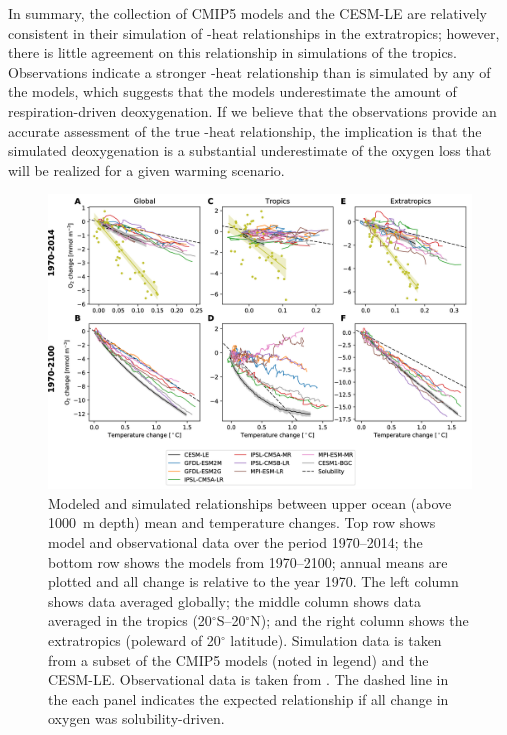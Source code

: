 \documentclass{report_chapter}
\begin{document}
In summary, the collection of CMIP5 models and the CESM-LE are relatively consistent in their simulation of \OO{}-heat relationships in the extratropics; however, there is little agreement on this relationship in simulations of the tropics.
Observations indicate a stronger \OO{}-heat relationship than is simulated by any of the models, which suggests that the models underestimate the amount of respiration-driven deoxygenation.
If we believe that the observations provide an accurate assessment of the true \OO{}-heat relationship, the implication is that the simulated deoxygenation is a substantial underestimate of the oxygen loss that will be realized for a given warming scenario.

\begin{figure}[tbp]
\centering
\includegraphics[width=1.1\textwidth]{o2change-temp-phase-diag.png}
\caption{Modeled and simulated relationships between upper ocean (above 1000~m depth) mean \OO{} and temperature changes.
Top row shows model and observational data over the period 1970--2014; the bottom row shows the models from 1970--2100; annual means are plotted and all change is relative to the year 1970.
The left column shows data averaged globally; the middle column shows data averaged in the tropics (20$^\circ$S--20$^\circ$N); and the right column shows  the extratropics (poleward of 20$^\circ$ latitude).
Simulation data is taken from a subset of the CMIP5 models (noted in legend) and the CESM-LE.
Observational data is taken from \citet{Ito-Minobe-etal-2017}.
The dashed line in the each panel indicates the expected relationship if all change in oxygen was solubility-driven.
}
\label{fig:o2-heat}
\end{figure}
\end{document}
